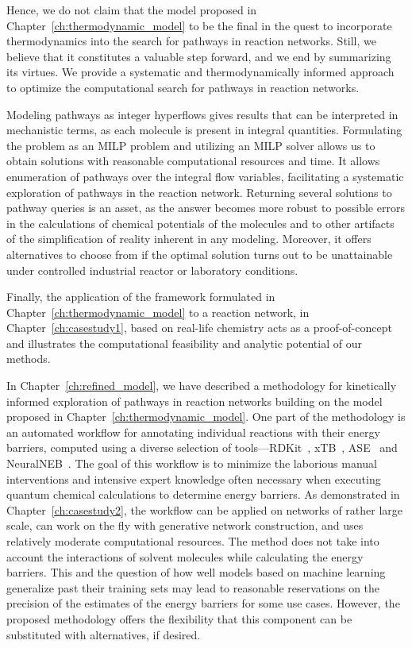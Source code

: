 Hence, we do not claim that the model proposed in Chapter~\ref{ch:thermodynamic_model} to be the final in the quest to incorporate thermodynamics into the search for pathways in reaction networks.
Still, we believe that it constitutes a valuable step forward, and we end by summarizing its virtues.
We provide a systematic and thermodynamically informed approach to optimize the computational search for pathways in reaction networks.

Modeling pathways as integer hyperflows gives results that can be interpreted in mechanistic terms,
as each molecule is present in integral quantities.
Formulating the problem as an MILP problem and utilizing an MILP solver allows us to obtain solutions with reasonable computational resources and time.
It allows enumeration of pathways over the integral flow variables, facilitating a systematic exploration of pathways in the reaction network.
Returning several solutions to pathway queries is an asset, as the answer becomes more robust to possible errors in the calculations of chemical potentials of the molecules and to other artifacts of the simplification of reality inherent in any modeling.
Moreover, it offers alternatives to choose from if the optimal solution turns out to be unattainable under controlled industrial reactor or laboratory conditions. 

Finally, the application of the framework formulated in Chapter~\ref{ch:thermodynamic_model} to a reaction network, in Chapter~\ref{ch:casestudy1}, based on real-life chemistry acts as a proof-of-concept and illustrates the computational feasibility and analytic potential of our methods.

In Chapter~\ref{ch:refined_model}, we have described a methodology for kinetically informed exploration of pathways in reaction networks building on the model proposed in Chapter~\ref{ch:thermodynamic_model}. 
One part of the methodology is an automated workflow for annotating individual reactions with their energy barriers, computed using a diverse selection of tools---RDKit~\cite{rdkit_embedMolecule}, xTB~\cite{grimme_xtb}, ASE~\cite{ase-paper} and NeuralNEB~\cite{neuralneb}. The goal of this workflow is to minimize the laborious manual interventions and intensive expert knowledge often necessary when executing quantum chemical calculations to determine energy barriers. 
As demonstrated in Chapter~\ref{ch:casestudy2}, the workflow can be applied on networks of rather large scale, can work on the fly with generative network construction, and uses relatively moderate computational resources.
The method does not take into account the interactions of solvent molecules while calculating the energy barriers. This and the question of how well models based on machine learning generalize past their training sets may lead to reasonable reservations on the precision of the estimates of the energy barriers for some use cases. However, the proposed methodology offers the flexibility that this component can be substituted with alternatives, if desired.

